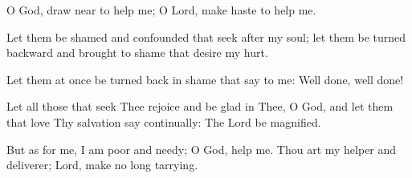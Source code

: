 O God, draw near to help me; O Lord, make haste to help me.

Let them be shamed and confounded that seek after my soul; let them be turned backward and brought to shame that desire my hurt.

Let them at once be turned back in shame that say to me: Well done, well done!

Let all those that seek Thee rejoice and be glad in Thee, O God, and let them that love Thy salvation say continually: The Lord be magnified.

But as for me, I am poor and needy; O God, help me. Thou art my helper and deliverer; Lord, make no long tarrying.

